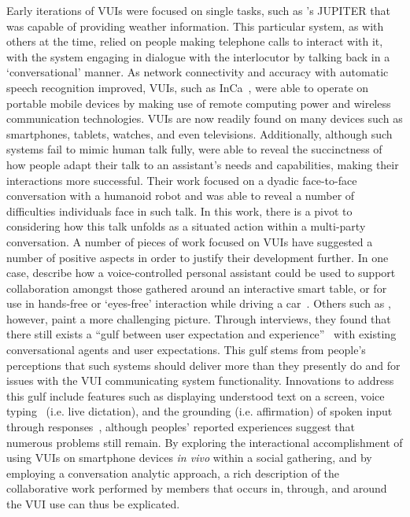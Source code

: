 Early iterations of \acp{VUI} were focused on single tasks, such as \citet{Zue2000}'s JUPITER that was capable of providing weather information.
This particular system, as with others at the time, relied on people making telephone calls to interact with it, with the system engaging in dialogue with the interlocutor by talking back in a `conversational' manner.
As network connectivity and accuracy with automatic speech recognition improved, \acp{VUI}, such as InCa~\citep{Kadous2004}, were able to operate on portable mobile devices by making use of remote computing power and wireless communication technologies.
\acp{VUI} are now readily found on many devices such as smartphones, tablets, watches, and even televisions.
Additionally, although such systems fail to mimic human talk fully, \citet{Pelikan2016} were able to reveal the succinctness of how people adapt their talk to an assistant's needs and capabilities, making their interactions more successful.
Their work focused on a dyadic face-to-face conversation with a humanoid robot and was able to reveal a number of difficulties individuals face in such talk.
In this work, there is a pivot to considering how this talk unfolds as a situated action within a multi-party conversation.
A number of pieces of work focused on \acp{VUI} have suggested a number of positive aspects in order to justify their development further.
In one case, \citet{Jones2014} describe how a voice-controlled personal assistant could be used to support collaboration amongst those gathered around an interactive smart table, or for use in hands-free or `eyes-free' interaction while driving a car~\citep{Cycil2013}.
Others such as \citet{Luger2016}, however, paint a more challenging picture.
Through interviews, they found that there still exists a ``gulf between user expectation and experience''~\citep[p. 1]{Luger2016} with existing conversational agents and user expectations.
This gulf stems from people's perceptions that such systems should deliver more than they presently do and for issues with the \ac{VUI} communicating system functionality.
Innovations to address this gulf include features such as displaying understood text on a screen, voice typing~\citep{Kumar2012a} (i.e. live dictation), and the grounding (i.e. affirmation) of spoken input through responses~\citep{Clark1991,McTear2016}, although peoples' reported experiences suggest that numerous problems still remain.
By exploring the interactional accomplishment of using \acp{VUI} on smartphone devices \textit{in vivo} within a social gathering, and by employing a conversation analytic approach, a rich description of the collaborative work performed by members that occurs in, through, and around the \ac{VUI} use can thus be explicated.



